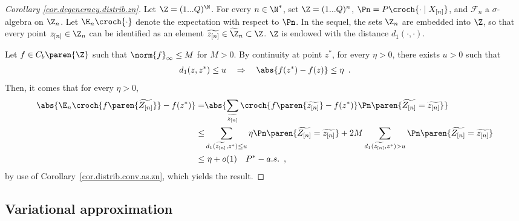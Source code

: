 \documentclass[11pt]{article}
\newtheorem{proof}{Proof}%
\newcommand{\Xn}{X_{[n]}}
\newcommand{\Zn}{Z_{[n]}}
\newcommand{\zn}{z_{[n]}}
\begin{document}
\begin{proof}[Corollary \ref{cor.degeneracy.distrib.zn}]
Let $\Z=(1...Q)^{\N}$. For every $n\in\N^*$, set  $\Z=(1...Q)^n$, $\Pn=P\croch{\cdot\mid \Xn}$, and $\mathcal{F}_n$ a $\sigma$-algebra on $\Z_n$.
%
 Let $\E_n\croch{\cdot}$ denote the expectation with respect to $\Pn$.
%
In the sequel, the sets $\Z_n$ are embedded into $\Z$, so that every point $\zn\in\Z_n$ can be identified as an element $\widetilde{\zn}\in \widetilde{\Z}_n\subset \Z$.
%
$\Z$ is endowed with the distance $d_1(\cdot,\cdot)$.

Let $f\in C_b\paren{\Z}$ such that $\norm{f}_{\infty}\leq M$ for $M>0$.
%
By continuity at point $z^*$, for every $\eta>0$, there exists $u>0$ such that
\begin{align*}
d_1(z,z^*) \leq u \quad \Rightarrow \quad \abs{f(z^*)-f(z)}\leq \eta \enspace.                                                   
\end{align*}
%
Then, it comes that for every $\eta>0$,
\begin{align*}
\abs{\E_n\croch{f\paren{\widetilde{\Zn}}}-f(z^*)} = & \abs{\sum_{\widetilde{\zn}}\croch{f\paren{\widetilde{\zn}}-f(z^*)}\Pn\paren{\widetilde{\Zn}=\widetilde{\zn}}} \\
 \leq & \sum_{ d_1(\widetilde{\zn},z^*)\leq u} \eta \Pn\paren{\widetilde{\Zn}=\widetilde{\zn}} + 2M \sum_{ d_1(\widetilde{\zn},z^*)> u} \Pn\paren{\widetilde{\Zn}=\widetilde{\zn}} \\
 \leq &\ \eta + o(1) \quad P^*-a.s.\enspace,
\end{align*}
by use of Corollary~\ref{cor.distrib.conv.as.zn}, which yields the result.


\end{proof}



\subsection{Variational approximation}
\end{document}
